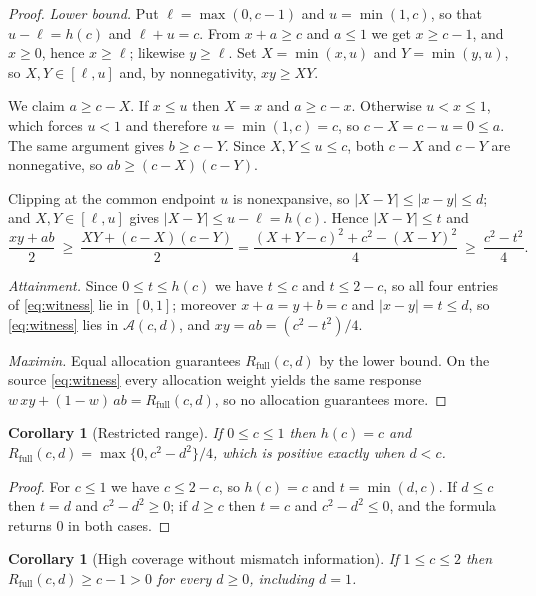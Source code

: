 \documentclass[11pt]{article}
\newtheorem{corollary}[theorem]{Corollary}
\theoremstyle{definition}
\theoremstyle{remark}
\newcommand{\Rfull}{R_{\mathrm{full}}}
\newcommand{\hc}{h(c)}
\begin{document}
\begin{proof}
\emph{Lower bound.} Put $\ell=\max(0,c-1)$ and $u=\min(1,c)$, so that
$u-\ell=\hc$ and $\ell+u=c$. From $x+a\ge c$ and $a\le1$ we get $x\ge c-1$, and
$x\ge0$, hence $x\ge\ell$; likewise $y\ge\ell$. Set $X=\min(x,u)$ and
$Y=\min(y,u)$, so $X,Y\in[\ell,u]$ and, by nonnegativity, $xy\ge XY$.

We claim $a\ge c-X$. If $x\le u$ then $X=x$ and $a\ge c-x$. Otherwise $u<x\le1$,
which forces $u<1$ and therefore $u=\min(1,c)=c$, so $c-X=c-u=0\le a$. The same
argument gives $b\ge c-Y$. Since $X,Y\le u\le c$, both $c-X$ and $c-Y$ are
nonnegative, so $ab\ge(c-X)(c-Y)$.

Clipping at the common endpoint $u$ is nonexpansive, so $|X-Y|\le|x-y|\le d$;
and $X,Y\in[\ell,u]$ gives $|X-Y|\le u-\ell=\hc$. Hence $|X-Y|\le t$ and
\begin{equation}\label{eq:identity}
\frac{xy+ab}{2}\ \ge\ \frac{XY+(c-X)(c-Y)}{2}
=\frac{(X+Y-c)^2+c^2-(X-Y)^2}{4}\ \ge\ \frac{c^2-t^2}{4}.
\end{equation}

\emph{Attainment.} Since $0\le t\le\hc$ we have $t\le c$ and $t\le2-c$, so all
four entries of \eqref{eq:witness} lie in $[0,1]$; moreover $x+a=y+b=c$ and
$|x-y|=t\le d$, so \eqref{eq:witness} lies in $\mathcal A(c,d)$, and
$xy=ab=(c^2-t^2)/4$.

\emph{Maximin.} Equal allocation guarantees $\Rfull(c,d)$ by the lower bound.
On the source \eqref{eq:witness} every allocation weight yields the same
response $w\,xy+(1-w)\,ab=\Rfull(c,d)$, so no allocation guarantees more.
\end{proof}

\begin{corollary}[Restricted range]\label{cor:restricted}
If $0\le c\le1$ then $\hc=c$ and
$\Rfull(c,d)=\max\{0,c^2-d^2\}/4$, which is positive exactly when $d<c$.
\end{corollary}

\begin{proof}
For $c\le1$ we have $c\le2-c$, so $\hc=c$ and $t=\min(d,c)$. If $d\le c$ then
$t=d$ and $c^2-d^2\ge0$; if $d\ge c$ then $t=c$ and $c^2-d^2\le0$, and the
formula returns $0$ in both cases.
\end{proof}

\begin{corollary}[High coverage without mismatch information]\label{cor:highcov}
If $1\le c\le2$ then $\Rfull(c,d)\ge c-1>0$ for every $d\ge0$, including $d=1$.
\end{corollary}
\end{document}
